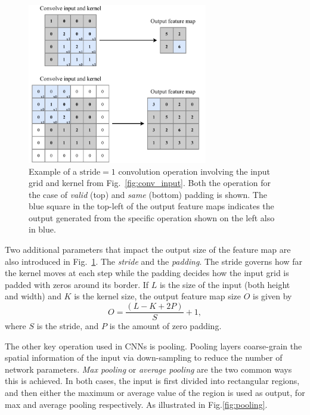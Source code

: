 \begin{figure} %
    \includegraphics[width=0.7\textwidth]{diagrams/6-cnn/conv_operation.pdf}
    \caption[Example of a convolutional operation]
    {Example of a $\mathrm{stride}=1$ convolution operation involving the input grid and kernel
        from Fig.~\ref{fig:conv_input}. Both the operation for the case of \emph{valid} (top) and
        \emph{same} (bottom) padding is shown. The blue square in the top-left of the output
        feature maps indicates the output generated from the specific operation shown on the left
        also in blue.}
    \label{fig:conv_operation}
\end{figure}

Two additional parameters that impact the output size of the feature map are also introduced in
Fig.~\ref{fig:conv_operation}. The \emph{stride} and the \emph{padding}. The stride governs how
far the kernel moves at each step while the padding decides how the input grid is padded with
zeros around its border. If $L$ is the size of the input (both height and width) and $K$ is the
kernel size, the output feature map size $O$ is given by
\begin{equation}
    O=\frac{(L-K+2P)}{S}+1,
    \label{eq:conv_size}
\end{equation}
where $S$ is the stride, and $P$ is the amount of zero padding.

The other key operation used in CNNs is pooling. Pooling layers coarse-grain the spatial
information of the input via down-sampling to reduce the number of network parameters. \emph{Max
    pooling} or \emph{average pooling} are the two common ways this is achieved. In both cases, the
input is first divided into rectangular regions, and then either the maximum or average value of
the region is used as output, for max and average pooling respectively. As illustrated in
Fig.\ref{fig:pooling}.

